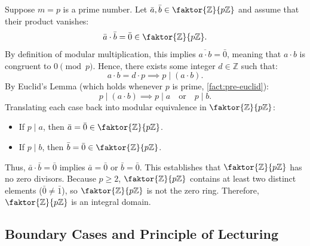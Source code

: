 \begin{proofWrapper}
\begin{content}
Suppose $m = p$ is a prime number. Let $\bar{a}, \bar{b} \in \faktor{\mathbb{Z}}{p\mathbb{Z}}$ and assume that their product vanishes:
\begin{equation}\label{eq:prime-prod-zero}
\bar{a} \cdot \bar{b} = \bar{0} \in \faktor{\mathbb{Z}}{p\mathbb{Z}}.
\end{equation}
By definition of modular multiplication, this implies $\overline{a \cdot b} = \bar{0}$, meaning that $a \cdot b$ is congruent to $0 \pmod p$. Hence, there exists some integer $d \in \mathbb{Z}$ such that:
\begin{equation}\label{eq:divisible-by-p}
a \cdot b = d \cdot p \implies p \mid (a \cdot b).
\end{equation}
By Euclid's Lemma (which holds whenever $p$ is prime, \cref{fact:pre-euclid}):
\begin{equation}\label{eq:euclids-lemma}
p \mid (a \cdot b) \implies p \mid a \quad \text{or} \quad p \mid b.
\end{equation}
Translating each case back into modular equivalence in $\faktor{\mathbb{Z}}{p\mathbb{Z}}$:
\begin{itemize}
    \item If $p \mid a$, then $\bar{a} = \bar{0} \in \faktor{\mathbb{Z}}{p\mathbb{Z}}$.
    \item If $p \mid b$, then $\bar{b} = \bar{0} \in \faktor{\mathbb{Z}}{p\mathbb{Z}}$.
\end{itemize}
Thus, $\bar{a} \cdot \bar{b} = \bar{0}$ implies $\bar{a} = \bar{0}$ or $\bar{b} = \bar{0}$. This establishes that $\faktor{\mathbb{Z}}{p\mathbb{Z}}$ has no zero divisors. Because $p \ge 2$, $\faktor{\mathbb{Z}}{p\mathbb{Z}}$ contains at least two distinct elements ($\bar{0} \neq \bar{1}$), so $\faktor{\mathbb{Z}}{p\mathbb{Z}}$ is not the zero ring. Therefore, $\faktor{\mathbb{Z}}{p\mathbb{Z}}$ is an integral domain.
\end{content}

\end{proofWrapper}

\subsection{Boundary Cases and Principle of Lecturing}

